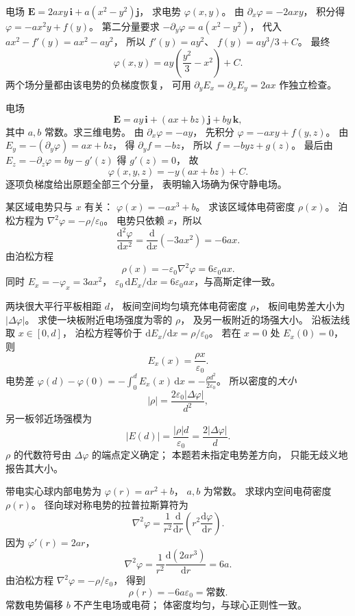 电场
$\bm E=2axy\,\bm i+a(x^2-y^2)\bm j$，
求电势 $\varphi(x,y)$。
\exsolution
由
$\partial_x\varphi=-2axy$，
积分得
$\varphi=-ax^2y+f(y)$。
第二分量要求
$-\partial_y\varphi=a(x^2-y^2)$，
代入
$ax^2-f'(y)=ax^2-ay^2$，
所以 $f'(y)=ay^2$、
$f(y)=ay^3/3+C$。
最终
\[
\boxed{\varphi(x,y)=
ay\left(\frac{y^2}{3}-x^2\right)+C}.
\]
\excheck 两个场分量都由该电势的负梯度恢复，
可用 $\partial_yE_x=\partial_xE_y=2ax$
作独立检查。

电场
\[
\bm E=ay\,\bm i+(ax+bz)\bm j+by\,\bm k,
\]
其中 $a,b$ 常数。求三维电势。
\exsolution
由 $\partial_x\varphi=-ay$，
先积分
$\varphi=-axy+f(y,z)$。
由 $E_y=-(\partial_y\varphi)
=ax+bz$，
得
$\partial_yf=-bz$，
所以
$f=-byz+g(z)$。
最后由
$E_z=-\partial_z\varphi=by-g'(z)$
得 $g'(z)=0$，
故
\[
\boxed{\varphi(x,y,z)=-y(ax+bz)+C}.
\]
\excheck 逐项负梯度给出原题全部三个分量，
表明输入场确为保守静电场。

某区域电势只与 $x$ 有关：
$\varphi(x)=-ax^3+b$。
求该区域体电荷密度 $\rho(x)$。
\exsolution
泊松方程为
$\nabla^2\varphi=-\rho/\varepsilon_0$。
电势只依赖 $x$，所以
\[
\frac{\mathrm d^2\varphi}{\mathrm dx^2}
=\frac{\mathrm d}{\mathrm dx}(-3ax^2)=-6ax.
\]
由泊松方程
\[
\boxed{\rho(x)=-\varepsilon_0\nabla^2\varphi
=6\varepsilon_0ax}.
\]
\excheck 同时
$E_x=-\varphi_x=3ax^2$，
$\varepsilon_0\,\mathrm dE_x/\mathrm dx
=6\varepsilon_0ax$，与高斯定律一致。

两块很大平行平板相距 $d$，
板间空间均匀填充体电荷密度 $\rho$，
板间电势差大小为 $|\Delta\varphi|$。
求使一块板附近电场强度为零的 $\rho$，
及另一板附近的场强大小。
\exsolution
沿板法线取 $x\in[0,d]$，
泊松方程等价于
$\mathrm dE_x/\mathrm dx=\rho/\varepsilon_0$。
若在 $x=0$ 处 $E_x(0)=0$，则
\[
E_x(x)=\frac{\rho x}{\varepsilon_0}.
\]
电势差
$\varphi(d)-\varphi(0)
=-\int_0^dE_x(x)\,\mathrm dx
=-\frac{\rho d^2}{2\varepsilon_0}$。
所以密度的\emph{大小}
\[
\boxed{|\rho|=
\frac{2\varepsilon_0|\Delta\varphi|}{d^2}},
\]
另一板邻近场强模为
\[
\boxed{|E(d)|=\frac{|\rho|d}{\varepsilon_0}
=\frac{2|\Delta\varphi|}{d}}.
\]
\excheck $\rho$ 的代数符号由
$\Delta\varphi$ 的端点定义确定；
本题若未指定电势差方向，
只能无歧义地报告其大小。

带电实心球内部电势为
$\varphi(r)=ar^2+b$，
$a,b$ 为常数。
求球内空间电荷密度 $\rho(r)$。
\exsolution
径向球对称电势的拉普拉斯算符为
\[
\nabla^2\varphi=
\frac1{r^2}\frac{\mathrm d}{\mathrm dr}
\left(r^2\frac{\mathrm d\varphi}{\mathrm dr}\right).
\]
因为 $\varphi'(r)=2ar$，
\[
\nabla^2\varphi
=\frac1{r^2}\frac{\mathrm d(2ar^3)}{\mathrm dr}
=6a.
\]
由泊松方程
$\nabla^2\varphi=-\rho/\varepsilon_0$，
得到
\[
\boxed{\rho(r)=-6a\varepsilon_0=\text{常数}}.
\]
\excheck 常数电势偏移 $b$ 不产生电场或电荷；
体密度均匀，与球心正则性一致。

